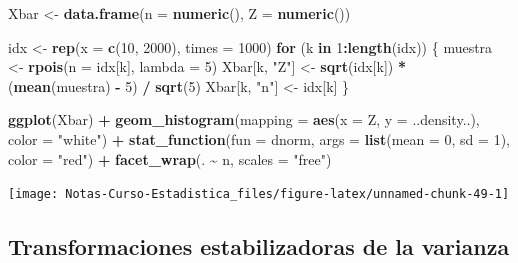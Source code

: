 \documentclass[
  12pt,
]{book}
\newenvironment{Shaded}{\begin{snugshade}}{\end{snugshade}}
\newcommand{\ControlFlowTok}[1]{\textcolor[rgb]{0.13,0.29,0.53}{\textbf{#1}}}
\newcommand{\DataTypeTok}[1]{\textcolor[rgb]{0.13,0.29,0.53}{#1}}
\newcommand{\DecValTok}[1]{\textcolor[rgb]{0.00,0.00,0.81}{#1}}
\newcommand{\KeywordTok}[1]{\textcolor[rgb]{0.13,0.29,0.53}{\textbf{#1}}}
\newcommand{\NormalTok}[1]{#1}
\newcommand{\OperatorTok}[1]{\textcolor[rgb]{0.81,0.36,0.00}{\textbf{#1}}}
\newcommand{\StringTok}[1]{\textcolor[rgb]{0.31,0.60,0.02}{#1}}
\begin{document}
\begin{Shaded}
\begin{Highlighting}[]
\NormalTok{Xbar \textless{}{-}}\StringTok{ }\KeywordTok{data.frame}\NormalTok{(}\DataTypeTok{n =} \KeywordTok{numeric}\NormalTok{(), }\DataTypeTok{Z =} \KeywordTok{numeric}\NormalTok{())}

\NormalTok{idx \textless{}{-}}\StringTok{ }\KeywordTok{rep}\NormalTok{(}\DataTypeTok{x =} \KeywordTok{c}\NormalTok{(}\DecValTok{10}\NormalTok{, }\DecValTok{2000}\NormalTok{), }\DataTypeTok{times =} \DecValTok{1000}\NormalTok{)}
\ControlFlowTok{for}\NormalTok{ (k }\ControlFlowTok{in} \DecValTok{1}\OperatorTok{:}\KeywordTok{length}\NormalTok{(idx)) \{}
\NormalTok{  muestra \textless{}{-}}\StringTok{ }\KeywordTok{rpois}\NormalTok{(}\DataTypeTok{n =}\NormalTok{ idx[k], }\DataTypeTok{lambda =} \DecValTok{5}\NormalTok{)}
\NormalTok{  Xbar[k, }\StringTok{"Z"}\NormalTok{] \textless{}{-}}\StringTok{ }\KeywordTok{sqrt}\NormalTok{(idx[k]) }\OperatorTok{*}\StringTok{ }\NormalTok{(}\KeywordTok{mean}\NormalTok{(muestra) }\OperatorTok{{-}}\StringTok{ }\DecValTok{5}\NormalTok{) }\OperatorTok{/}\StringTok{ }\KeywordTok{sqrt}\NormalTok{(}\DecValTok{5}\NormalTok{)}
\NormalTok{  Xbar[k, }\StringTok{"n"}\NormalTok{] \textless{}{-}}\StringTok{ }\NormalTok{idx[k]}
\NormalTok{\}}



\KeywordTok{ggplot}\NormalTok{(Xbar) }\OperatorTok{+}
\StringTok{  }\KeywordTok{geom\_histogram}\NormalTok{(}\DataTypeTok{mapping =} \KeywordTok{aes}\NormalTok{(}\DataTypeTok{x =}\NormalTok{ Z, }\DataTypeTok{y =}\NormalTok{ ..density..), }\DataTypeTok{color =} \StringTok{"white"}\NormalTok{) }\OperatorTok{+}
\StringTok{  }\KeywordTok{stat\_function}\NormalTok{(}\DataTypeTok{fun =}\NormalTok{ dnorm, }\DataTypeTok{args =} \KeywordTok{list}\NormalTok{(}\DataTypeTok{mean =} \DecValTok{0}\NormalTok{, }\DataTypeTok{sd =} \DecValTok{1}\NormalTok{), }\DataTypeTok{color =} \StringTok{"red"}\NormalTok{) }\OperatorTok{+}
\StringTok{  }\KeywordTok{facet\_wrap}\NormalTok{(. }\OperatorTok{\textasciitilde{}}\StringTok{ }\NormalTok{n, }\DataTypeTok{scales =} \StringTok{"free"}\NormalTok{)}
\end{Highlighting}
\end{Shaded}

\begin{center}\texttt{[image: Notas-Curso-Estadistica\_files/figure-latex/unnamed-chunk-49-1]} \end{center}

\hypertarget{transformaciones-estabilizadoras-de-la-varianza}{%
\subsection{Transformaciones estabilizadoras de la varianza}\label{transformaciones-estabilizadoras-de-la-varianza}}
\end{document}

